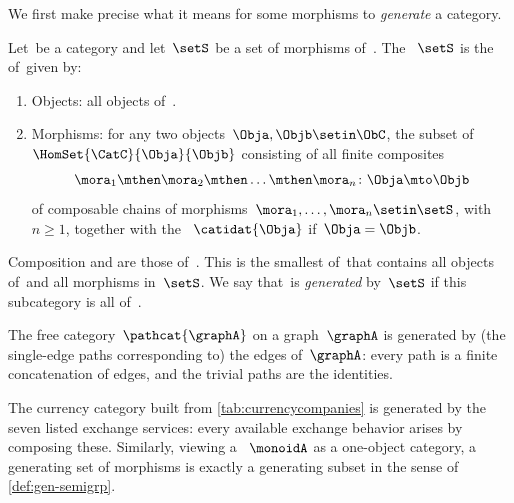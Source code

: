 We first make precise what it means for some morphisms to \emph{generate} a category.

\begin{ctdefinition}
    \label{def:generated-subcategory}
    Let~\CatC be a category and let~$\setS$ be a set of morphisms of~\CatC.
    The ~$\setS$ is the  of~\CatC given by:

    \constit

    \begin{enumerate}
        \item Objects: all objects of~\CatC.
        \item Morphisms: for any two objects~$\Obja, \Objb \setin \ObC$, the subset of~$\HomSet{\CatC}{\Obja}{\Objb}$ consisting of all finite composites
              \begin{equation}
                  \mora_1 \mthen \mora_2 \mthen \dots \mthen \mora_n \colon \Obja \mto \Objb
              \end{equation}
              of composable chains of morphisms~$\mora_1, \dots, \mora_n \setin \setS$, with~$n \geq 1$, together with the ~$\catidat{\Obja}$ if~$\Obja = \Objb$.
    \end{enumerate}

    Composition and  are those of~\CatC.
    This is the smallest  of~\CatC that contains all objects of~\CatC and all morphisms in~$\setS$.
    We say that~\CatC is \emph{generated} by~$\setS$ if this subcategory is all of~\CatC.
\end{ctdefinition}

\begin{example}
    The free category~$\pathcat{\graphA}$ on a graph~$\graphA$ is generated by (the single-edge paths corresponding to) the edges of~$\graphA$: every path is a finite concatenation of edges, and the trivial paths are the identities.
\end{example}

\begin{example}
    The currency category built from \cref{tab:currencycompanies} is generated by the seven listed exchange services: every available exchange behavior arises by composing these.
    Similarly, viewing a ~$\monoidA$ as a one-object category, a generating set of morphisms is exactly a generating subset in the sense of \cref{def:gen-semigrp}.
\end{example}

